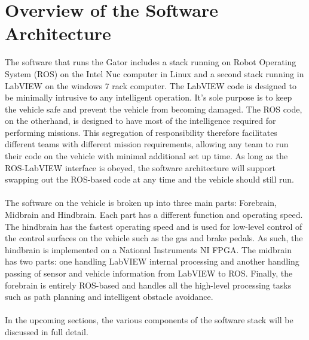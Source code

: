 \documentclass[12pt]{article}
\begin{document}
\renewcommand{\thefootnote}{\arabic{footnote}}



\tableofcontents

\newpage

\listoffigures

\newpage

\listoftables

\newpage

\newpage

\newpage

\newpage

\section{Overview of the Software Architecture}
The software that runs the Gator includes a stack running on Robot Operating System (ROS) on the Intel Nuc computer in Linux and a second stack running in LabVIEW on the windows 7 rack computer. The LabVIEW code is designed to be minimally intrusive to any intelligent operation. It's sole purpose is to keep the vehicle safe and prevent the vehicle from becoming damaged. The ROS code, on the otherhand, is designed to have most of the intelligence required for performing missions. This segregation of responsibility therefore facilitates different teams with different mission requirements, allowing any team to run their code on the vehicle with minimal additional set up time. As long as the ROS-LabVIEW interface is obeyed, the software architecture will support swapping out the ROS-based code at any time and the vehicle should still run.\\ \\
%
\noindent The software on the vehicle is broken up into three main parts: Forebrain, Midbrain and Hindbrain. Each part has a different function and operating speed. The hindbrain has the fastest operating speed and is used for low-level control of the control surfaces on the vehicle such as the gas and brake pedals. As such, the hindbrain is implemented on a National Instruments NI FPGA. The midbrain has two parts: one handling LabVIEW internal processing and another handling passing of sensor and vehicle information from LabVIEW to ROS. Finally, the forebrain is entirely ROS-based and handles all the high-level processing tasks such as path planning and intelligent obstacle avoidance. \\ \\
%
In the upcoming sections, the various components of the software stack will be discussed in full detail.

\newpage


\newpage

\newpage

\end{document}
